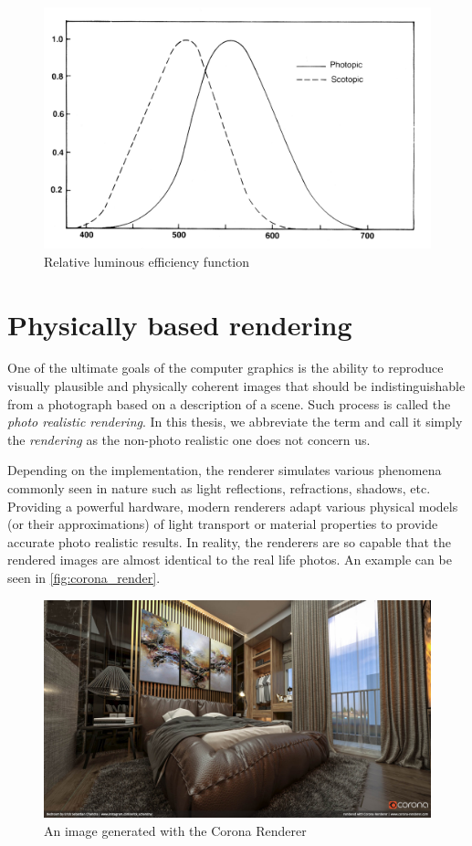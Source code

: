 \begin{figure}[h]
	\centering
	\includegraphics[width=0.8\linewidth]{img/luminous_efficiency.png}
	\caption{Relative luminous efficiency function~\cite{colorScienceSlides}}
	\label{fig:lum}
\end{figure}

\section{Physically based rendering}

One of the ultimate goals of the computer graphics is the ability to reproduce visually plausible and physically coherent images that should be indistinguishable from a photograph based on a description of a scene. Such process is called the \emph{photo realistic rendering}. In this thesis, we abbreviate the term and call it simply the \emph{rendering} as the non-photo realistic one does not concern us.

Depending on the implementation, the renderer simulates various phenomena commonly seen in nature such as light reflections, refractions, shadows, etc. Providing a powerful hardware, modern renderers adapt various physical models (or their approximations) of light transport or material properties to provide accurate photo realistic results. In reality, the renderers are so capable that the rendered images are almost identical to the real life photos. An example can be seen in \autoref{fig:corona_render}.

\begin{figure}[h]
	\centering
	\includegraphics[width=\linewidth]{img/corona_render.jpg}
	\caption[Corona image]{An image generated with the Corona Renderer\footnotemark}
	\label{fig:corona_render}
\end{figure}

